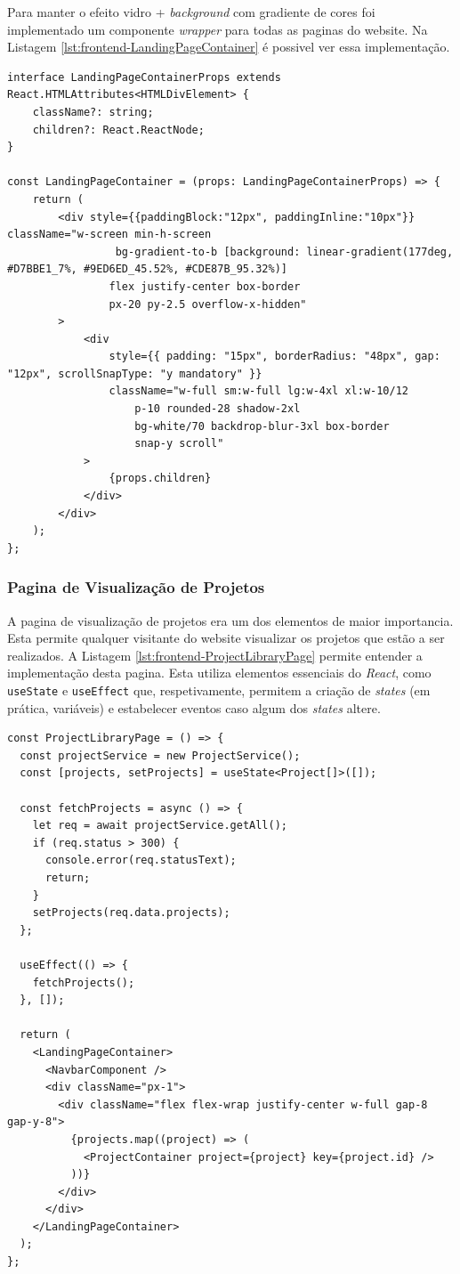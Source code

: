 Para manter o efeito vidro + \textit{background} com gradiente de cores foi implementado um componente \textit{wrapper} para todas as paginas do website. Na Listagem \ref{lst:frontend-LandingPageContainer} é possivel ver essa implementação.

\begin{lstlisting}[caption={Função LandingPageContainer}, label={lst:frontend-LandingPageContainer}]
interface LandingPageContainerProps extends React.HTMLAttributes<HTMLDivElement> {
	className?: string;
    children?: React.ReactNode;
}

const LandingPageContainer = (props: LandingPageContainerProps) => {
    return (
        <div style={{paddingBlock:"12px", paddingInline:"10px"}} className="w-screen min-h-screen
            	 bg-gradient-to-b [background: linear-gradient(177deg, #D7BBE1_7%, #9ED6ED_45.52%, #CDE87B_95.32%)]
            	flex justify-center box-border
				px-20 py-2.5 overflow-x-hidden"
		>
			<div
				style={{ padding: "15px", borderRadius: "48px", gap: "12px", scrollSnapType: "y mandatory" }}
				className="w-full sm:w-full lg:w-4xl xl:w-10/12
            		p-10 rounded-28 shadow-2xl
            		bg-white/70 backdrop-blur-3xl box-border
					snap-y scroll"
			>
				{props.children}
			</div>
		</div>
    );
};
\end{lstlisting}

\subsubsection{Pagina de Visualização de Projetos}

A pagina de visualização de projetos era um dos elementos de maior importancia. Esta permite qualquer visitante do website visualizar os projetos que estão a ser realizados. A Listagem \ref{lst:frontend-ProjectLibraryPage} permite entender a implementação desta pagina. Esta utiliza elementos essenciais do \textit{React}, como \lstinline|useState| e \lstinline|useEffect| que, respetivamente, permitem a criação de \textit{states} (em prática, variáveis) e estabelecer eventos caso algum dos \textit{states} altere.  

\begin{lstlisting}[caption={Função ProjectLibraryPage}, label={lst:frontend-ProjectLibraryPage}]
const ProjectLibraryPage = () => {
  const projectService = new ProjectService();
  const [projects, setProjects] = useState<Project[]>([]);

  const fetchProjects = async () => {
    let req = await projectService.getAll();
    if (req.status > 300) {
      console.error(req.statusText);
      return;
    }
    setProjects(req.data.projects);
  };

  useEffect(() => {
    fetchProjects();
  }, []);

  return (
    <LandingPageContainer>
      <NavbarComponent />
      <div className="px-1">
        <div className="flex flex-wrap justify-center w-full gap-8 gap-y-8">
          {projects.map((project) => (
            <ProjectContainer project={project} key={project.id} />
          ))}
        </div>
      </div>
    </LandingPageContainer>
  );
};
\end{lstlisting}

